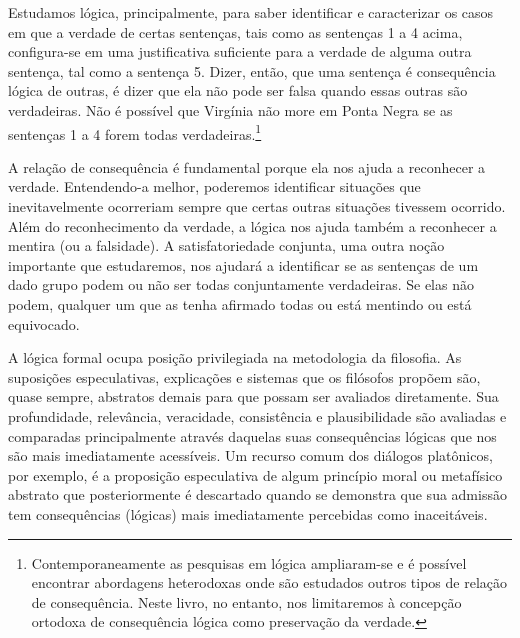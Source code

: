 Estudamos lógica, principalmente, para saber identificar e caracterizar os casos em que a verdade de certas sentenças, tais como as sentenças 1 a 4 acima, configura-se em uma justificativa suficiente para a verdade de alguma outra sentença, tal como a sentença 5.
Dizer, então, que uma sentença é consequência lógica de outras, é dizer que ela não pode ser falsa quando essas outras são verdadeiras.
Não é possível que Virgínia não more em Ponta Negra se as sentenças 1 a 4 forem todas verdadeiras.\footnote{
	Contemporaneamente as pesquisas em lógica ampliaram-se e é possível encontrar abordagens heterodoxas onde são estudados outros tipos de relação de consequência.
	Neste livro, no entanto, nos limitaremos à concepção ortodoxa de consequência lógica como preservação da verdade.}

A relação de consequência é fundamental porque ela nos ajuda a reconhecer a verdade.
Entendendo-a melhor, poderemos identificar situações que inevitavelmente ocorreriam sempre que certas outras situações tivessem ocorrido.
Além do reconhecimento da verdade, a lógica nos ajuda também a reconhecer a mentira (ou a falsidade).
A satisfatoriedade conjunta, uma outra noção importante que estudaremos, nos ajudará a identificar se as sentenças de um dado grupo podem ou não ser todas conjuntamente verdadeiras.
Se elas não podem, qualquer um que as tenha afirmado todas ou está mentindo ou está equivocado.



A lógica formal ocupa posição privilegiada na metodologia da filosofia. 
As suposições especulativas, explicações e sistemas que os filósofos propõem  são, quase sempre, abstratos demais para que possam ser avaliados diretamente. 
Sua profundidade, relevância, veracidade, consistência e plausibilidade são avaliadas e comparadas principalmente através daquelas suas consequências lógicas que nos são mais imediatamente acessíveis.
Um recurso comum dos diálogos platônicos, por exemplo, é a proposição especulativa de algum princípio moral ou metafísico abstrato que posteriormente é descartado quando se demonstra que sua admissão tem consequências (lógicas) mais imediatamente percebidas como inaceitáveis.

